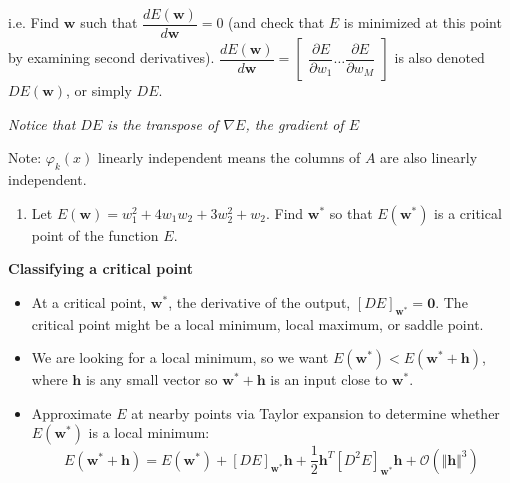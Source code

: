 \documentclass[12pt,letterpaper,noanswers]{exam}
\newcommand{\vc}[1]{\boldsymbol{#1}}
\begin{document}
    i.e. Find $\vc{w}$ such that $\dfrac{dE(\vc{w})}{d\vc{w}} = 0$ (and check that $E$ is minimized at this point by examining second derivatives).  $\dfrac{dE(\vc{w})}{d\vc{w}}=\left[\begin{array}{ccc} \dfrac{\partial E}{\partial w_1} \hdots \dfrac{\partial E}{\partial w_M} \end{array}\right]$ is also denoted $DE(\vc{w})$, or simply $DE$.
    
    \emph{Notice that $DE$ is the transpose of $\nabla E$, the gradient of $E$}
    

Note: $\varphi_k(x)$ linearly independent means the columns of $A$ are also linearly independent.



\begin{enumerate}[resume=classQ]
\item Let $E(\vc{w}) = w_1^2+4w_1w_2+3w_2^2+w_2$.  
 Find $\vc{w}^*$ so that $E(\vc{w}^*)$ is a critical point of the function $E$.




\end{enumerate}

\noindent\textbf{Classifying a critical point}
\begin{tcolorbox}
\begin{itemize}
\itemsep0pt
    \item At a critical point, $\vc{w}^*$, the derivative of the output, $\left[DE\right]_{\vc{w}^*} = \vc{0}$.  The critical point might be a local minimum, local maximum, or saddle point.
    \item We are looking for a local minimum, so we want $E(\vc{w}^*) < E(\vc{w}^*+\vc{h})$, where $\vc{h}$ is any small vector so $\vc{w}^*+\vc{h}$ is an input close to $\vc{w}^*$.
    
    \item Approximate $E$ at nearby points via Taylor expansion to determine whether $E(\vc{w}^*)$ is a local minimum:
    \[E(\vc{w}^*+\vc{h}) = E(\vc{w}^*) + \left[DE\right]_{\vc{w}^*}\vc{h} + \frac{1}{2} \vc{h}^T\left[D^2E\right]_{\vc{w}^*}\vc{h} + \mathcal{O}(\Vert\vc{h}\Vert^3)\]
    
        \end{itemize}
\end{tcolorbox}
    
\end{document}
